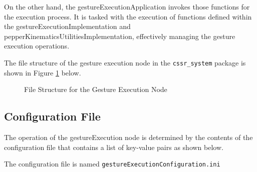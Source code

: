 \documentclass{CSSRforAfrica}
\renewcommand{\DTstyle}{\footnotesize\sffamily}
\begin{document}
On the other hand, the gestureExecutionApplication invokes those functions for the execution process. It is tasked with the execution of functions defined within the gestureExecutionImplementation and pepperKinematicsUtilitiesImplementation, effectively
managing the gesture execution operations.

The file structure of the gesture execution node in the \texttt{cssr\_system} package is shown in Figure \ref{fig:filestructure} below.

\vspace*{0.5em}

\begin{figure}[h!]
\renewcommand*\DTstyle{\ttfamily}
 \caption{File Structure for the Gesture Execution Node}
\label{fig:filestructure}
\end{figure}

\newpage

\subsection*{Configuration File}
The operation of the gestureExecution node is determined by the contents of the configuration file that contains a list of key-value pairs as shown below.	

The configuration file is named \texttt{gestureExecutionConfiguration.ini}
\end{document}
